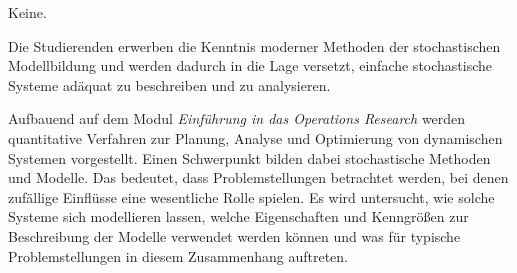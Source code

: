 \begin{course}

\setdoclanguagegerman
{}



\coursehead


\label{cour_5703.dp_997}


\begin{styleenv}
\begin{assessment}

\end{assessment}

\begin{conditions}Keine.\end{conditions}


\end{styleenv}

\begin{learningoutcomes}
Die Studierenden erwerben die Kenntnis moderner Methoden der stochastischen Modellbildung und werden dadurch in die Lage versetzt, einfache stochastische Systeme adäquat zu beschreiben und zu analysieren.


\end{learningoutcomes}

\begin{content}
Aufbauend auf dem Modul \emph{Einführung in das Operations Research} werden quantitative Verfahren zur Planung, Analyse und Optimierung von dynamischen Systemen vorgestellt. Einen Schwerpunkt bilden dabei stochastische Methoden und Modelle. Das bedeutet, dass Problemstellungen betrachtet werden, bei denen zufällige Einflüsse eine wesentliche Rolle spielen. Es wird untersucht, wie solche Systeme sich modellieren lassen, welche Eigenschaften und Kenngrößen zur Beschreibung der Modelle verwendet werden können und was für typische Problemstellungen in diesem Zusammenhang auftreten.


\end{content}
\end{course}
